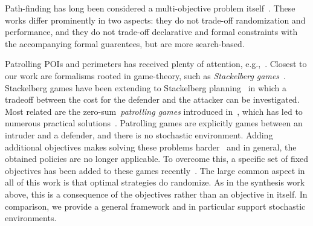 Path-finding has long been considered a multi-objective problem itself~\cite{DBLP:conf/icra/AmigoniG05,DBLP:journals/eswa/NazarahariKD19,DBLP:conf/icml/XuTMRSM20}.
These works differ prominently in two aspects: they do not trade-off randomization and performance, and they do not trade-off declarative and formal constraints with the accompanying formal guarentees, but are more search-based. 

Patrolling POIs and perimeters has received plenty of attention, e.g.,~\cite{DBLP:conf/icra/AgmonKK08,DBLP:conf/icra/AmigoniBG09,DBLP:conf/iros/PortugalPRC14}.  
Closest to our work are  formalisms rooted in game-theory,  such as  \emph{Stackelberg games}~\cite{simaan1973stackelberg,DBLP:conf/atal/ParuchuriPTOK07}. Stackelberg games have been extending to Stackelberg planning~\cite{DBLP:conf/aaai/SpeicherS00K18} in which a tradeoff between the cost for the defender and the attacker can be investigated.
Most related are the zero-sum~\emph{patrolling games} introduced in~\cite{DBLP:journals/ior/AlpernMP11}, which has led to numerous practical solutions~\cite{DBLP:books/daglib/0040483}. Patrolling games are explicitly games between an intruder and a defender, and there is no stochastic environment.  Adding additional objectives makes solving these problems harder~\cite{DBLP:conf/atal/Klaska0R20} and in general, the obtained policies are no longer applicable. To overcome this, a specific set of fixed objectives has been added to these games recently~\cite{DBLP:conf/atal/Klaska0R20}. 
 The large common aspect in all of this work is that optimal strategies do randomize. As in the synthesis work above, this is a consequence of the objectives rather than an objective in itself. 
 In comparison, we provide a general framework and in particular support stochastic environments.
 
